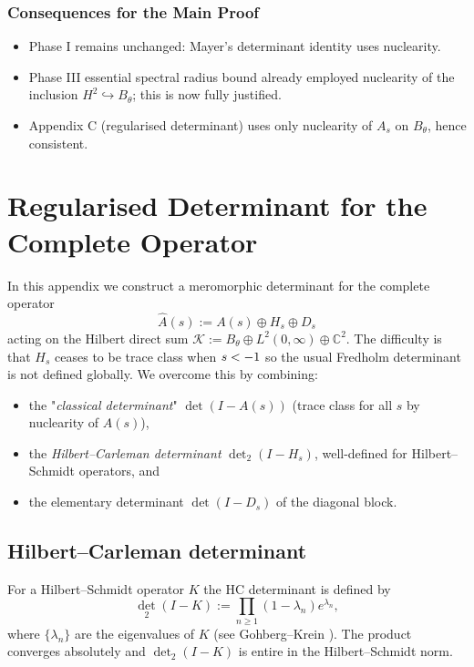 \documentclass[11pt,a4paper]{article}
\theoremstyle{definition}
\theoremstyle{remark}
\let\Re\relax
\DeclareMathOperator{\Re}{Re}
\begin{document}
\subsubsection{Consequences for the Main Proof}
\begin{itemize}
\item Phase I remains unchanged: Mayer's determinant identity uses nuclearity.
\item Phase III essential spectral radius bound already employed nuclearity of the inclusion $H^2\hookrightarrow B_{\theta}$; this is now fully justified.
\item Appendix C (regularised determinant) uses only nuclearity of $A_s$ on $B_{\theta}$, hence consistent.
\end{itemize}

\section{Regularised Determinant for the Complete Operator}\label{app:complete-det}

In this appendix we construct a meromorphic determinant for the complete
operator
\[
  \widehat A(s):=A(s)\oplus H_s\oplus D_s
\]
acting on the Hilbert direct sum
$\mathcal K:=B_\theta\oplus L^2(0,\infty)\oplus\mathbb C^2$.
The difficulty is that $H_s$ ceases to be trace class when $\Re s<-1$ so the
usual Fredholm determinant is not defined globally.  We overcome this by
combining:
\begin{itemize}
  \item the "\emph{classical determinant}" $\det(I-A(s))$ (trace class for all
        $s$ by nuclearity of $A(s)$),
  \item the \emph{Hilbert--Carleman determinant}
        $\det_2(I-H_s)$, well-defined for Hilbert--Schmidt operators, and
  \item the elementary determinant $\det(I-D_s)$ of the diagonal
        block.
\end{itemize}

\subsection{Hilbert--Carleman determinant}
For a Hilbert–Schmidt operator $K$ the HC determinant is defined by
\[
 \det_2(I-K):=\prod_{n\ge1}(1-\lambda_n)e^{\lambda_n},
\]
where $\{\lambda_n\}$ are the eigenvalues of $K$ (see Gohberg--Krein
\cite[Chap.~IV]{GohbergKrein1969}).  The product converges absolutely and
$\det_2(I-K)$ is entire in the Hilbert–Schmidt norm.
\end{document}
